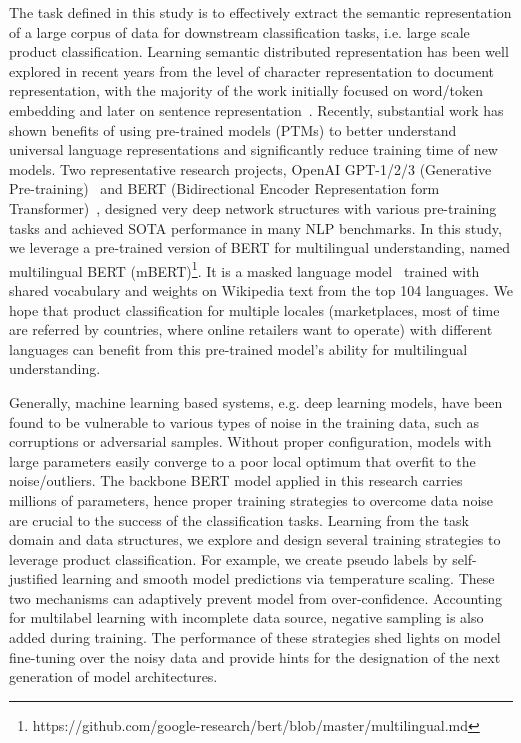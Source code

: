 \documentclass[11pt,dvipsnames]{article}
\begin{document}
The task defined in this study is to effectively extract the semantic representation of a large corpus of data for downstream classification tasks, i.e. large scale product classification. Learning semantic distributed representation has been well explored in recent years from the level of character representation to document representation, with the majority of the work initially focused on word/token embedding and later on sentence representation~\cite{pennington2014glove,bojanowski2017enriching,peters2018deep}. Recently, substantial work has shown benefits of using pre-trained models (PTMs) to better understand universal language representations and significantly reduce training time of new models. Two representative research projects, OpenAI GPT-1/2/3 (Generative Pre-training)~\cite{radford2018improving,radford2019language,brown2020language} and BERT (Bidirectional Encoder Representation form Transformer)~\cite{devlin2018bert}, designed very deep network structures with various pre-training tasks and achieved SOTA performance in many NLP benchmarks. In this study, we leverage a pre-trained version of BERT for multilingual understanding, named multilingual BERT (mBERT)\footnote{https://github.com/google-research/bert/blob/master/multilingual.md}. It is a masked language model~\cite{taylor1953cloze} trained with shared vocabulary and weights on Wikipedia text from the top 104 languages. We hope that product classification for multiple locales (marketplaces, most of time are referred by countries, where 
online retailers want to operate) with different languages can benefit from this pre-trained model's ability for multilingual understanding.  

Generally, machine learning based systems, e.g. deep learning models, have been found to be vulnerable to various types of noise in the training data, such as corruptions or adversarial samples. Without proper configuration, models with large parameters easily converge to a poor local optimum that overfit to the noise/outliers. The backbone BERT model applied in this research carries millions of parameters, hence proper training strategies to overcome data noise are crucial to the success of the classification tasks. Learning from the task domain and data structures, we explore and design several training strategies to leverage product classification. For example, we create pseudo labels by self-justified learning and smooth model predictions via temperature scaling. These two mechanisms can adaptively prevent model from over-confidence. Accounting for multilabel learning with incomplete data source, negative sampling is also added during training. The performance of these strategies shed lights on model fine-tuning over the noisy data and provide hints for the designation of the next generation of model architectures.    
\end{document}
